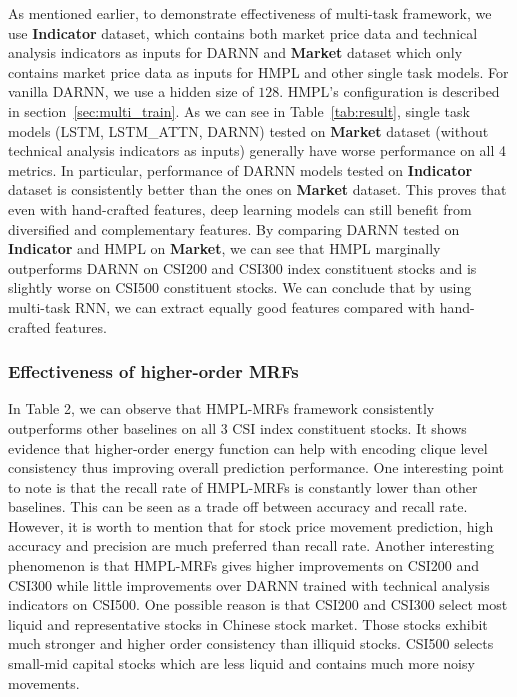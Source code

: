\documentclass[sigconf,anonymous,review]{acmart}
\begin{document}
As mentioned earlier, to demonstrate effectiveness of multi-task
framework, we use \textbf{Indicator} dataset, which contains both
market price data and technical analysis indicators as inputs for
DARNN and \textbf{Market} dataset which only contains market
price data as inputs for HMPL and other single task models. For
vanilla DARNN, we use a hidden size of $128$. HMPL's
configuration is described in section~\ref{sec:multi_train}. As
we can see in Table~\ref{tab:result}, single task models (LSTM,
LSTM\_ATTN, DARNN) tested on \textbf{Market} dataset (without
technical analysis indicators as inputs) generally have worse
performance on all 4 metrics. In particular, performance of DARNN
models tested on \textbf{Indicator} dataset is consistently
better than the ones on \textbf{Market} dataset. This proves that
even with hand-crafted features, deep learning models can still
benefit from diversified and complementary features. By comparing
DARNN tested on \textbf{Indicator} and HMPL on \textbf{Market},
we can see that HMPL marginally outperforms DARNN on CSI200 and
CSI300 index constituent stocks and is slightly worse on CSI500
constituent stocks. We can conclude that by using multi-task
RNN, we can extract equally good features compared with
hand-crafted features.

\subsubsection{Effectiveness of higher-order MRFs}

In Table 2, we can observe that HMPL-MRFs framework consistently outperforms other baselines on all 3 CSI index constituent stocks. It shows evidence that higher-order energy function can help with
encoding clique level consistency thus improving overall
prediction performance. One interesting point to note is that the recall rate of HMPL-MRFs is constantly lower than other baselines. This can be seen as a trade off between accuracy and recall rate. However, it is worth to mention that for stock price movement prediction, high accuracy and precision are much preferred than recall rate. Another interesting phenomenon is that HMPL-MRFs gives higher improvements on CSI200 and CSI300 while little improvements over DARNN trained with technical
analysis indicators on CSI500. One possible reason is that CSI200 and CSI300 select most liquid and representative stocks in Chinese stock market. Those stocks exhibit much stronger and higher order consistency than illiquid stocks. CSI500 selects small-mid
capital stocks which are less liquid and contains much more noisy movements.
\end{document}
